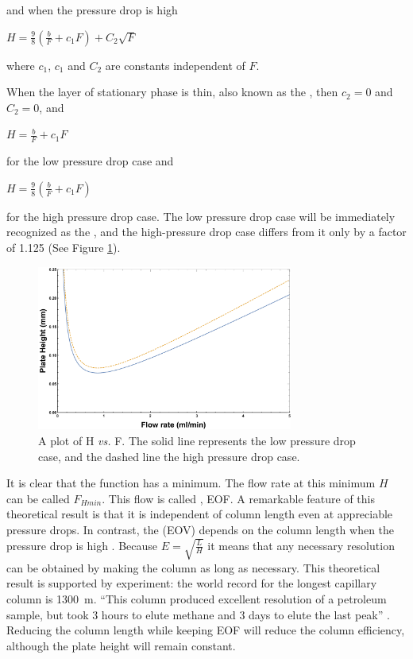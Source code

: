 and when the pressure drop is high

\(H = \frac{\displaystyle 9}{\displaystyle 8} \left(\frac{b}{F}+c_{1}F \right)+C_{2}\sqrt{F}\)

where \(c_1\), \(c_1\) and \(C_2\) are constants independent of \(F\).

When the layer of stationary phase is thin, also known as the , then \(c_2 = 0\) and \(C_2 = 0\), and

\(H = \frac{\displaystyle b}{\displaystyle F} + c_{1} F \) 

for the low pressure drop case and 

\(H = \frac{\displaystyle 9}{\displaystyle 8} \left(\frac{b}{F}+c_{1}F \right)\)

for the high pressure drop case. The low pressure drop case will be immediately
recognized as the , and the high-pressure drop
case differs from it only by a factor of \num{1.125} (See Figure
\ref{fig:VanDeemter}).

\begin{figure}
\centering
\includegraphics[width=0.75\textwidth]{Figures/VanDeemter.pdf}
\decoRule

\caption[A plot of H \textit{vs.} F]{A plot of H \textit{vs.} F. The solid line
represents the low pressure drop case, and the dashed line the high pressure
drop case.}

\label{fig:VanDeemter}
\end{figure}

It is clear that the function has a minimum. The flow rate at this minimum \(H\)
can be called \(F_{Hmin}\). This flow is called , EOF. A remarkable feature of this theoretical result is that it is
independent of column length \autocite{Blumberg1999} even at appreciable
pressure drops. In contrast, the  (EOV)
depends on the column length when the pressure drop is high
\autocite{Blumberg1997}. Because \(E = \sqrt{\frac{L}{H}} \) it means that any
necessary resolution can be obtained by making the column as long as necessary.
This theoretical result is supported by experiment: the world record for the
longest capillary column is \SI{1300}{\metre}. ``This column produced excellent
resolution of a petroleum sample, but took 3 hours to elute methane and 3 days
to elute the last peak'' \autocite{Ferguson2013}. Reducing the column length
while keeping EOF will reduce the column efficiency, although the plate height
will remain constant.

